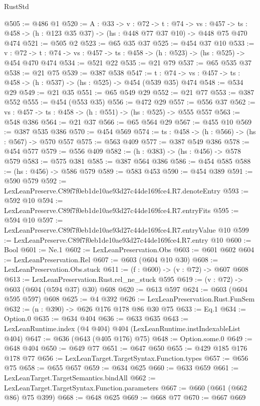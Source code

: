 \begin{lexlean}{RustStd}
\begin{coremodule}
@505 := @486 @1
@520 := {A : @33} ->
  {v : @72} ->
  {t : @74} ->
  {vs : @457} -> {ts : @458} -> (h : @123 @35 @37) -> (hs : @448 @77 @37 @10) -> @448 @75 @470 @474
@521 := @505 @2
@523 := @65 @35 @37
@525 := @454 @37 @10
@533 := {v : @72} ->
  {t : @74} -> {vs : @457} -> {ts : @458} -> (h : @523) -> (hs : @525) -> @454 @470 @474
@534 := @521 @22
@535 := @21 @79
@537 := @65 @535 @37
@538 := @21 @75
@539 := @387 @538
@547 := {t : @74} -> {vs : @457} -> {ts : @458} -> (h : @537) -> (hs : @525) -> @454 (@539 @35) @474
@548 := @534 @29
@549 := @21 @35
@551 := @65 @549 @29
@552 := @21 @77
@553 := @387 @552
@555 := @454 (@553 @35)
@556 := @472 @29
@557 := @556 @37
@562 := {vs : @457} -> {ts : @458} -> (h : @551) -> (hs : @525) -> @555 @557
@563 := @548 @386
@564 := @21 @37
@566 := @65 @564 @29
@567 := @455 @10
@569 := @387 @535 @386
@570 := @454 @569
@574 := {ts : @458} -> (h : @566) -> (hs : @567) -> @570 @557
@575 := @563 @409
@577 := @387 @549 @386
@578 := @454 @577
@579 := @556 @409
@582 := (h : @383) -> (hs : @456) -> @578 @579
@583 := @575 @381
@585 := @387 @564 @386
@586 := @454 @585
@588 := (hs : @456) -> @586 @579
@589 := @583 @453
@590 := @454 @389
@591 := @590 @579
@592 := LexLeanPreserve.C89f7f0eb1de10ae93d27c44de169fce4.R7.denoteEntry
@593 := @592 @10
@594 := LexLeanPreserve.C89f7f0eb1de10ae93d27c44de169fce4.R7.entryFits
@595 := @594 @10
@597 := LexLeanPreserve.C89f7f0eb1de10ae93d27c44de169fce4.R7.entryValue @10
@599 := LexLeanPreserve.C89f7f0eb1de10ae93d27c44de169fce4.R7.entry @10
@600 := Bool
@601 := Ne.{1}
@602 := LexLeanPreservation.Obs
@603 := @601 @602
@604 := LexLeanPreservation.Rel
@607 := @603 (@604 @10 @30)
@608 := LexLeanPreservation.Obs.stuck
@611 := (f : @600) -> (v : @72) -> @607 @608
@613 := LexLeanPreservation.Rust.rel_ne_stuck @595
@619 := (v : @72) -> @603 (@604 (@594 @37) @30) @608
@620 := @613 @597
@624 := @603 (@604 @595 @597) @608
@625 := @4 @392
@626 := LexLeanPreservation.Rust.FunSem
@632 := (n : @390) -> @626 @176 @178 @86 @30 @75
@633 := Eq.{1}
@634 := Option.{0}
@635 := @634 @404
@636 := @633 @635
@643 := LexLeanRuntime.index (@4 @404) @404 (LexLeanRuntime.instIndexableList @404)
@647 := @636 (@643 (@405 @176) @75)
@648 := Option.some.{0}
@649 := @648 @404
@650 := @649 @77
@651 := @647 @650
@655 := @429 @185 @176 @178 @77
@656 := LexLeanTarget.TargetSyntax.Function.types
@657 := @656 @75
@658 := @655 @657
@659 := @634 @625
@660 := @633 @659
@661 := LexLeanTarget.TargetSemantics.bindAll
@662 := LexLeanTarget.TargetSyntax.Function.parameters
@667 := @660 (@661 (@662 @86) @75 @399)
@668 := @648 @625
@669 := @668 @77
@670 := @667 @669

\end{coremodule}
\end{lexlean}
